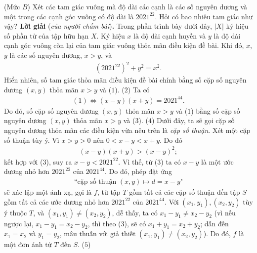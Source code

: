 \begin{multicols}{2}
	(Mức $B$) Xét các tam giác vuông mà độ dài các cạnh là các số nguyên dương và một trong các cạnh góc vuông có độ dài là $2021^{22}$. Hỏi có bao nhiêu tam giác như vậy? 
	\vskip 0.05cm
	\textbf{\color{thachthuctoanhoc}Lời giải} (\textit{của người chấm bài})\textbf{\color{thachthuctoanhoc}.}
	\vskip 0.05cm
	Trong phần trình bày dưới đây, $|X|$ ký hiệu số phần tử của tập hữu hạn $X$.
	\vskip 0.05cm
	Ký hiệu $x$ là độ dài cạnh huyền và $y$ là độ dài cạnh góc vuông còn lại của tam giác vuông thỏa mãn điều kiện đề bài. Khi đó, $x$, $y$ là các số nguyên dương, $x > y$, và
	\begin{align*}
		{\left( {{{2021}^{22}}} \right)^2} + {y^2} = {x^2}. \tag{$1$}
	\end{align*}
	Hiển nhiên, số tam giác thỏa mãn điều kiện đề bài chính bằng số cặp số nguyên dương $(x, y)$ thỏa mãn $x > y$ và ($1$). \hfill ($2$)
	\vskip 0.05cm
	Ta có
	\begin{align*}
		(1) \Leftrightarrow \left( {x - y} \right)\left( {x + y} \right) = {2021^{44}}. \tag{$3$}
	\end{align*}
	Do đó, số cặp số nguyên dương $(x, y)$ thỏa mãn $x > y$ và ($1$) bằng số cặp số nguyên dương $(x, y)$ thỏa mãn $x > y$ và ($3$). \hfill ($4$)
	\vskip 0.05cm
	Dưới đây, ta sẽ gọi cặp số nguyên dương thỏa mãn các điều kiện vừa nêu trên là \textit{cặp số thuận}.
	\vskip 0.05cm
	Xét một cặp số thuận tùy ý. Vì $x > y > 0$ nên  $0 < x - y < x + y$. Do đó
	\begin{align*}
		\left( {x - y} \right)\left( {x + y} \right) > {\left( {x - y} \right)^2};
	\end{align*}
	kết hợp với ($3$), suy ra $x - y < 2021^{22}$. Vì thế, từ ($3$) ta có $x - y$ là một ước dương nhỏ hơn $2021^{22}$  của $2021^{44}$. Do đó, phép đặt ứng
	\begin{align*}
		\text{``cặp số thuận } (x, y) \mapsto   d = x - y\text{"}
	\end{align*}
	sẽ xác lập một ánh xạ, gọi là $f$, từ tập $T$ gồm tất cả các cặp số thuận đến tập $S$ gồm tất cả các ước dương nhỏ hơn $2021^{22}$  của $2021^{44}$.
	\vskip 0.05cm 
	Với $\left( {{x_1},{y_1}} \right),\left( {{x_2},{y_2}} \right)$  tùy ý thuộc $T$, và $\left( {{x_1},{y_1}} \right) \ne \left( {{x_2},{y_2}} \right)$, dễ thấy, ta có ${x_1} - {y_1} \ne {x_2} - {y_2}$  (vì nếu ngược lại,  ${x_1} - {y_1} = {x_2} - {y_2}$, thì theo ($3$), sẽ có  ${x_1} + {y_1} = {x_2} + {y_2}$; dẫn đến $x_1 = x_2$  và  $y_1 = y_2$, mâu thuẫn với giả thiết  $\left( {{x_1},{y_1}} \right) \ne \left( {{x_2},{y_2}} \right)$). Do đó,  $f$ là một đơn ánh từ $T$ đến $S$. \hfill  ($5$)

\end{multicols}
